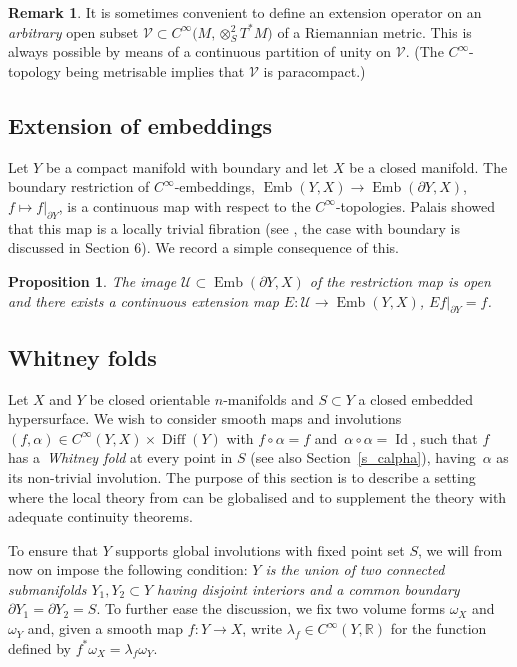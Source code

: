 \documentclass[pdftex]{sigma}
\numberwithin{equation}{section}
\newtheorem{Proposition}[Theorem]{Proposition}
\theoremstyle{definition}
\newtheorem{Remark}[Theorem]{Remark}
\newcommand{\R}{\mathbb{R}} %
\newcommand{\1}{{\bf 1}}
\newcommand{\Id}{\operatorname{Id}}
\DeclareMathOperator{\Diff}{Diff}
\begin{document}
\begin{Remark}\label{lem_rext2}
It is sometimes convenient to define an extension operator on an {\it arbitrary} open subset $\mathcal V\subset C^\infty\bigl(M,\otimes^2_ST^*M\bigr)$ of a Riemannian metric. This is always possible by means of a continuous partition of unity on $\mathcal V$. (The $C^\infty$-topology being metrisable implies that $\mathcal V$ is paracompact.)


\end{Remark}

\subsection{Extension of embeddings} Let $Y$ be a compact manifold with boundary and let $X$ be a closed manifold. The boundary restriction of $C^\infty$-embeddings,
$\operatorname{Emb}(Y,X)\to \operatorname{Emb}(\partial Y,X)$, $ f \mapsto f\vert_{\partial Y}$,
is a continuous map with respect to the $C^\infty$-topologies. Palais showed that this map is a locally trivial fibration (see \cite{Pal60}, the case with boundary is discussed in Section 6). We record a simple consequence of this.


\begin{Proposition}\label{prop_palais}
The image $\mathcal U\subset \operatorname{Emb}(\partial Y,X)$ of the restriction map is open and there exists a continuous extension map
$E\colon \mathcal U\to \operatorname{Emb}(Y,X)$, $ Ef|_{\partial Y} = f$.
\end{Proposition}


\subsection{Whitney folds}\label{s_whitney}

Let $X$ and $Y$ be closed orientable $n$-manifolds and $S\subset Y$ a closed embedded hypersurface. We wish to consider smooth maps and involutions
$(f,\alpha)\in C^\infty(Y,X)\times \Diff(Y)$ with $ f\circ \alpha = f $ and~${\alpha\circ \alpha=\Id}$,
such that $f$ has a~{\it Whitney fold} at every point in $S$ (see also Section~\ref{s_calpha}), having~$\alpha$ as its non-trivial involution. The purpose of this section is to describe a setting where the local theory from \cite[Section C.4]{Hor07} can be globalised and to supplement the theory with adequate continuity theorems.

To ensure that $Y$ supports global involutions with fixed point set $S$, we will from now on impose the following condition: {\it $Y$ is the union of two connected submanifolds $Y_1,Y_2\subset Y$ having disjoint interiors and a common boundary $\partial Y_1=\partial Y_2 =S$}. To further ease the discussion, we fix two volume forms $\omega_X$ and $\omega_Y$ and, given a smooth map $f\colon Y\to X$, write $\lambda_f\in C^\infty(Y,\R)$ for the function defined by $f^*\omega_X=\lambda_f \omega_Y$.
\end{document}
